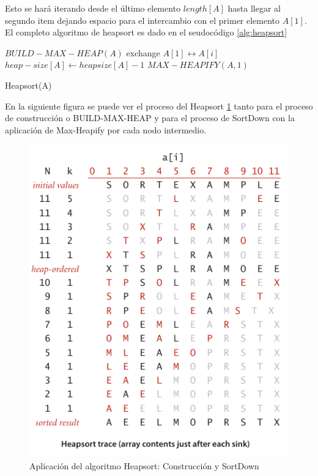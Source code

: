 \documentclass{article}
\begin{document}
    		        Esto se har\'{a} iterando desde el \'{u}ltimo elemento $length[A]$ hasta llegar al segundo item dejando espacio para el intercambio con el primer elemento $A[1]$. El completo algoritmo de heapsort es dado en el seudoc\'{o}digo \ref{alg:heapsort}
		         
		            \begin{algorithm}[H]
                        \begin{algorithmic}[1]
                            \STATE $BUILD-MAX-HEAP(A)$
                                \STATE exchange $A[1] \leftrightarrow A[i]$
                                \STATE $heap-size[A] \leftarrow heapsize[A]-1$
                                \STATE $MAX-HEAPIFY(A,1)$
                            \ENDFOR
                        \end{algorithmic}
                        \caption{Heapsort(A)}
                        \label{alg:heapsort}
                    \end{algorithm}
		        
		            En la siguiente figura se puede ver el proceso del Heapsort  \ref{fig:heap_trace} tanto para el proceso de construcci\'{o}n o BUILD-MAX-HEAP y para el proceso de SortDown con la aplicaci\'{o}n de Max-Heapify por cada nodo intermedio.
		            
		            \begin{figure}[H]
    		            \centering	 \includegraphics[scale=0.40]{img/heapsort_trace.png}
                        \caption{Aplicaci\'{o}n del algoritmo Heapsort: Construcción y SortDown \cite{Algorithms}}
                        \label{fig:heap_trace}
                    \end{figure}
                    
\end{document}
